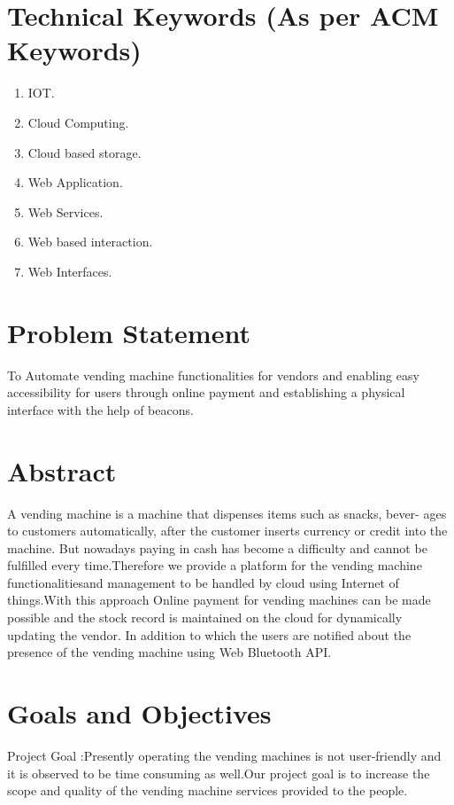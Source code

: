 \documentclass[oneside,a4paper,12pt]{report}
\begin{document}
\section{Technical Keywords (As per ACM Keywords)}
\begin{enumerate}

\item IOT.
\item Cloud Computing.
\item Cloud based storage.
\item Web Application.
\item Web Services.
\item Web based interaction.
\item Web Interfaces.
\end{enumerate}



\section{Problem Statement}
\label{sec:problem}
        To Automate vending machine functionalities for vendors and enabling easy accessibility for users through online payment and establishing a physical interface with the help of beacons. 
\section{Abstract}
A vending machine is a machine that dispenses items such as snacks, bever-
ages to customers automatically, after the customer inserts currency or credit
into the machine. But nowadays paying in cash has become a difficulty and cannot be fulfilled every time.Therefore we provide a platform for the vending machine functionalitiesand management to be handled by cloud using Internet of things.With this approach Online payment for vending machines can be made possible and the
stock record is maintained on the cloud for dynamically updating the vendor.
In addition to which the users are notified about the presence of the vending
machine using Web Bluetooth API.
		    		   

\section{Goals and Objectives}
Project Goal :Presently operating the vending machines is not user-friendly and it is observed to be time consuming as well.Our project goal is to increase the scope and quality of the vending machine services provided to the people. 
\end{document}
